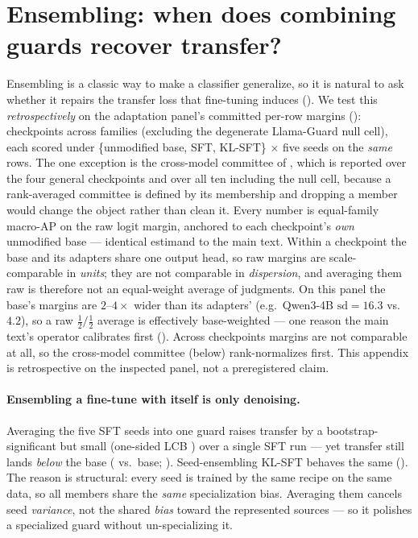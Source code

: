 \section{Ensembling: when does combining guards recover transfer?}
\label{app:ensembling}

Ensembling is a classic way to make a classifier generalize, so it is natural to ask whether it repairs
the transfer loss that fine-tuning induces (). We test this \emph{retrospectively} on the
adaptation panel's committed per-row margins (): \EnsNCk{} checkpoints across \EnsNFam{}
families (excluding the degenerate Llama-Guard null cell), each scored under \{unmodified base, SFT,
KL-SFT\} $\times$ five seeds on the \emph{same} rows. The one exception is the cross-model committee of
, which is reported over the four general checkpoints and over all ten
including the null cell, because a rank-averaged committee is defined by its membership and dropping a
member would change the object rather than clean it. Every number is equal-family macro-AP on the raw
logit margin, anchored to each checkpoint's \emph{own} unmodified base --- identical estimand to the main
text. Within a checkpoint the base and its adapters share one output head, so raw margins are scale-comparable
in \emph{units}; they are not comparable in \emph{dispersion}, and averaging them raw is therefore not
an equal-weight average of judgments. On this panel the base's margins are $2$--$4\times$ wider than its
adapters' (e.g.\ Qwen3-4B $\mathrm{sd}=16.3$ vs.\ $4.2$), so a raw $\tfrac12/\tfrac12$ average is
effectively base-weighted --- one reason the main text's operator calibrates first ().
Across checkpoints margins are not comparable at all, so the cross-model committee (below)
rank-normalizes first. This appendix is retrospective on the inspected panel, not a
preregistered claim.

\paragraph{Ensembling a fine-tune with itself is only denoising.} Averaging the five SFT seeds into one
guard raises transfer by a bootstrap-significant but small \EnsSeedGainTrans{} (one-sided LCB
\EnsSeedGainTransLCB{}) over a single SFT run --- yet transfer still lands \emph{below} the base
(\EnsSeedSFTdTrans{} vs.\ base; ). Seed-ensembling KL-SFT behaves the same
(\EnsSeedKLdTrans{}). The reason is structural: every seed is trained by the same recipe on the same data,
so all members share the \emph{same} specialization bias. Averaging them cancels seed \emph{variance}, not
the shared \emph{bias} toward the represented sources --- so it polishes a specialized guard without
un-specializing it.

